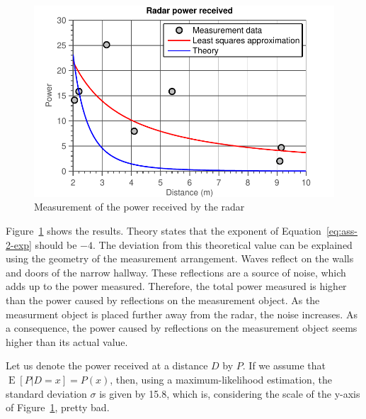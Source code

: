 \documentclass[11pt,titlepage]{report}
\begin{document}
\begin{figure}[H]
	\begin{center}
		\includegraphics[width=.8\linewidth]{resource/fit.pdf}
	\end{center}
	\caption{Measurement of the power received by the radar}
	\label{fig:ass-2-power}
\end{figure}

Figure~\ref{fig:ass-2-power} shows the results. Theory states that the exponent of Equation~\ref{eq:ass-2-exp} should be $-4$. The deviation from this theoretical value can be explained using the geometry of the measurement arrangement. Waves reflect on the walls and doors of the narrow hallway. These reflections are a source of noise, which adds up to the power measured. Therefore, the total power measured is higher than the power caused by reflections on the measurement object. As the measurment object is placed further away from the radar, the noise increases. As a consequence, the power caused by reflections on the measurement object seems higher than its actual value.

Let us denote the power received at a distance $D$ by $P$. If we assume that $\operatorname{E}[P|D=x]=P(x)$, then, using a maximum-likelihood estimation, the standard deviation $\sigma$ is given by \num{15.8}, which is, considering the scale of the y-axis of Figure~\ref{fig:ass-2-power}, pretty bad.
\end{document}
